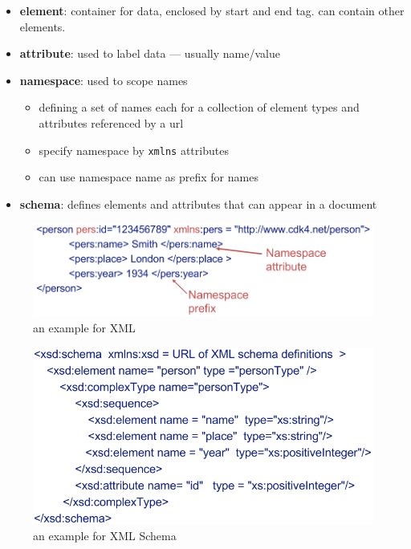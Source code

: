 \documentclass[twocolumn,landscape,10pt]{article}
\theoremstyle{definition}
\begin{document}
\begin{itemize}
    \item \textbf{element}: container for data, enclosed by start and end tag.
        can contain other elements.
    \item \textbf{attribute}: used to label data --- usually name/value
    \item \textbf{namespace}: used to scope names
        \begin{itemize}
            \item defining a set of names each for a collection of 
                element types and attributes referenced by a url 
            \item specify namespace by \texttt{xmlns} attributes
            \item can use namespace name as prefix for names
        \end{itemize} 
    \item \textbf{schema}: defines elements and attributes that can appear in a
        document
\end{itemize} 

\begin{figure}
  	\includegraphics[scale=0.35]{xml.png}
  	\centering
    \caption{an example for XML}
\end{figure}

\begin{figure}
  	\includegraphics[scale=0.35]{xml_schema.png}
  	\centering
    \caption{an example for XML Schema}
\end{figure}
\end{document}

